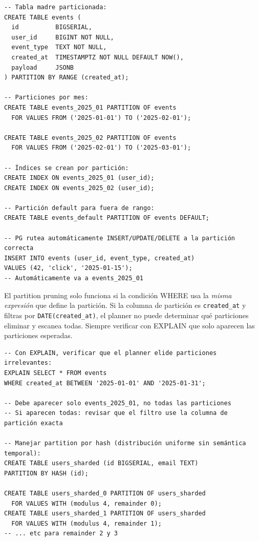 \begin{lstlisting}[caption={Table Partitioning por rango (tiempo)}]
-- Tabla madre particionada:
CREATE TABLE events (
  id          BIGSERIAL,
  user_id     BIGINT NOT NULL,
  event_type  TEXT NOT NULL,
  created_at  TIMESTAMPTZ NOT NULL DEFAULT NOW(),
  payload     JSONB
) PARTITION BY RANGE (created_at);

-- Particiones por mes:
CREATE TABLE events_2025_01 PARTITION OF events
  FOR VALUES FROM ('2025-01-01') TO ('2025-02-01');

CREATE TABLE events_2025_02 PARTITION OF events
  FOR VALUES FROM ('2025-02-01') TO ('2025-03-01');

-- Índices se crean por partición:
CREATE INDEX ON events_2025_01 (user_id);
CREATE INDEX ON events_2025_02 (user_id);

-- Partición default para fuera de rango:
CREATE TABLE events_default PARTITION OF events DEFAULT;

-- PG rutea automáticamente INSERT/UPDATE/DELETE a la partición correcta
INSERT INTO events (user_id, event_type, created_at)
VALUES (42, 'click', '2025-01-15');
-- Automáticamente va a events_2025_01
\end{lstlisting}

El partition pruning solo funciona si la condición WHERE usa la \emph{misma expresión} que define la partición.
Si la columna de partición es \texttt{created\_at} y filtras por \texttt{DATE(created\_at)}, el planner no puede determinar qué particiones eliminar y escanea todas.
Siempre verificar con EXPLAIN que solo aparecen las particiones esperadas.

\begin{lstlisting}[caption={Partition pruning — verificar que funciona}]
-- Con EXPLAIN, verificar que el planner elide particiones irrelevantes:
EXPLAIN SELECT * FROM events
WHERE created_at BETWEEN '2025-01-01' AND '2025-01-31';

-- Debe aparecer solo events_2025_01, no todas las particiones
-- Si aparecen todas: revisar que el filtro use la columna de partición exacta

-- Manejar partition por hash (distribución uniforme sin semántica temporal):
CREATE TABLE users_sharded (id BIGSERIAL, email TEXT)
PARTITION BY HASH (id);

CREATE TABLE users_sharded_0 PARTITION OF users_sharded
  FOR VALUES WITH (modulus 4, remainder 0);
CREATE TABLE users_sharded_1 PARTITION OF users_sharded
  FOR VALUES WITH (modulus 4, remainder 1);
-- ... etc para remainder 2 y 3
\end{lstlisting}

